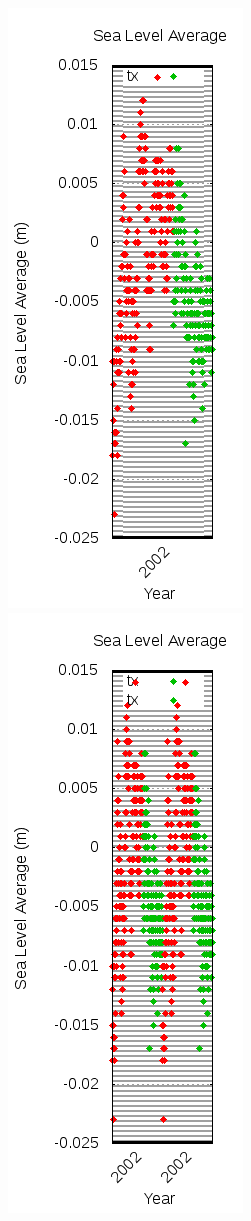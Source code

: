 \documentclass{article}
\begin{document}
\begin{figure}
\includegraphics{files/blog/2018_06_02_measuring_sea_level_averages_using_rads/2018_06_02_legend_before.png}
\includegraphics{files/blog/2018_06_02_measuring_sea_level_averages_using_rads/2018_06_02_legend_midway.png}

\end{figure}
\end{document}
